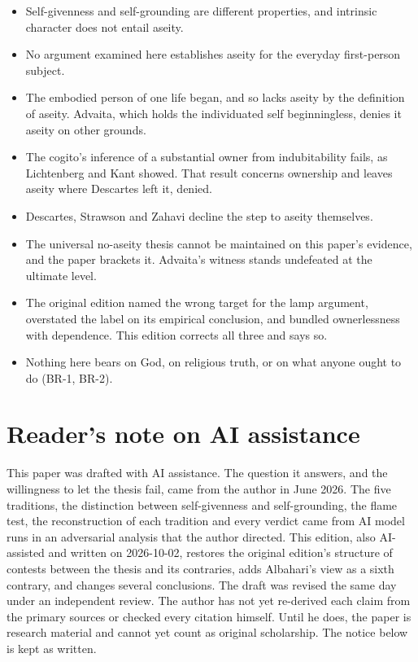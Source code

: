 \documentclass[11pt]{article}
\begin{document}
\begin{itemize}
\item Self-givenness and self-grounding are different properties, and intrinsic character does not entail aseity.
\item No argument examined here establishes aseity for the everyday first-person subject.
\item The embodied person of one life began, and so lacks aseity by the definition of aseity. Advaita, which holds the individuated self beginningless, denies it aseity on other grounds.
\item The cogito's inference of a substantial owner from indubitability fails, as Lichtenberg and Kant showed. That result concerns ownership and leaves aseity where Descartes left it, denied.
\item Descartes, Strawson and Zahavi decline the step to aseity themselves.
\item The universal no-aseity thesis cannot be maintained on this paper's evidence, and the paper brackets it. Advaita's witness stands undefeated at the ultimate level.
\item The original edition named the wrong target for the lamp argument, overstated the label on its empirical conclusion, and bundled ownerlessness with dependence. This edition corrects all three and says so.
\item Nothing here bears on God, on religious truth, or on what anyone ought to do (BR-1, BR-2).
\end{itemize}
\section*{Reader's note on AI assistance}

This paper was drafted with AI assistance. The question it answers, and the willingness to let the thesis fail, came from the author in June 2026. The five traditions, the distinction between self-givenness and self-grounding, the flame test, the reconstruction of each tradition and every verdict came from AI model runs in an adversarial analysis that the author directed. This edition, also AI-assisted and written on 2026-10-02, restores the original edition's structure of contests between the thesis and its contraries, adds Albahari's view as a sixth contrary, and changes several conclusions. The draft was revised the same day under an independent review. The author has not yet re-derived each claim from the primary sources or checked every citation himself. Until he does, the paper is research material and cannot yet count as original scholarship. The notice below is kept as written.
\end{document}

